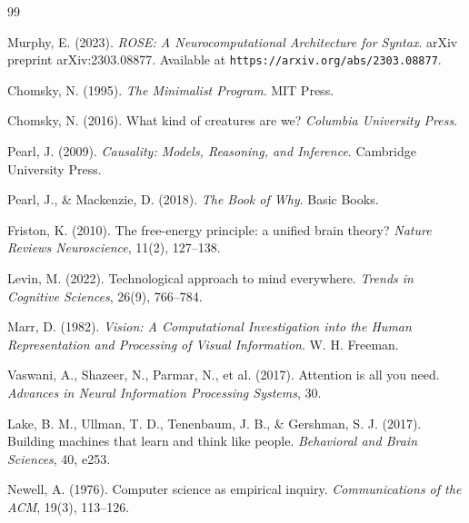 \documentclass[11pt]{article}
\begin{document}
\begin{thebibliography}{99}

Murphy, E. (2023).
\newblock \emph{ROSE: A Neurocomputational Architecture for Syntax}.
\newblock arXiv preprint arXiv:2303.08877.
\newblock Available at \texttt{https://arxiv.org/abs/2303.08877}.

Chomsky, N. (1995).
\newblock \emph{The Minimalist Program}.
\newblock MIT Press.

Chomsky, N. (2016).
\newblock What kind of creatures are we?
\newblock \emph{Columbia University Press}.

Pearl, J. (2009).
\newblock \emph{Causality: Models, Reasoning, and Inference}.
\newblock Cambridge University Press.

Pearl, J., \& Mackenzie, D. (2018).
\newblock \emph{The Book of Why}.
\newblock Basic Books.

Friston, K. (2010).
\newblock The free-energy principle: a unified brain theory?
\newblock \emph{Nature Reviews Neuroscience}, 11(2), 127--138.

Levin, M. (2022).
\newblock Technological approach to mind everywhere.
\newblock \emph{Trends in Cognitive Sciences}, 26(9), 766--784.

Marr, D. (1982).
\newblock \emph{Vision: A Computational Investigation into the Human Representation and Processing of Visual Information}.
\newblock W. H. Freeman.

Vaswani, A., Shazeer, N., Parmar, N., et al. (2017).
\newblock Attention is all you need.
\newblock \emph{Advances in Neural Information Processing Systems}, 30.

Lake, B. M., Ullman, T. D., Tenenbaum, J. B., \& Gershman, S. J. (2017).
\newblock Building machines that learn and think like people.
\newblock \emph{Behavioral and Brain Sciences}, 40, e253.

Newell, A. (1976).
\newblock Computer science as empirical inquiry.
\newblock \emph{Communications of the ACM}, 19(3), 113--126.

\end{thebibliography}
\end{document}
